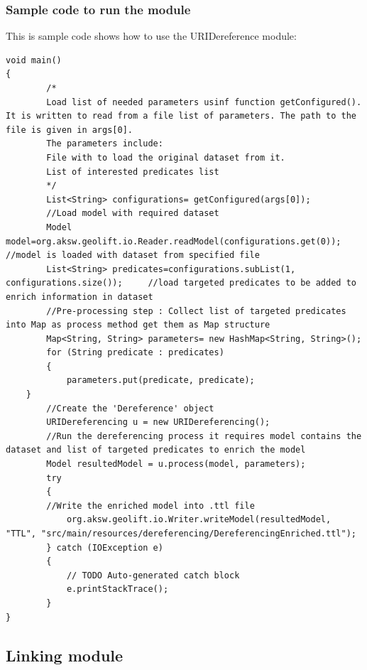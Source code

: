 \documentclass[a4paper,twoside,bibtotoc,abstracton,12pt,BCOR=15mm]{article}
\begin{document}
\subsubsection{Sample code to run the module}
This is sample code shows how to use the URIDereference module:\\
\begin{lstlisting}
void main()
{
    	/*
    	Load list of needed parameters usinf function getConfigured(). It is written to read from a file list of parameters. The path to the file is given in args[0].
    	The parameters include: 
    	File with to load the original dataset from it.
    	List of interested predicates list
    	*/
    	List<String> configurations= getConfigured(args[0]); 
    	//Load model with required dataset
    	Model model=org.aksw.geolift.io.Reader.readModel(configurations.get(0));       //model is loaded with dataset from specified file
    	List<String> predicates=configurations.subList(1, configurations.size());     //load targeted predicates to be added to enrich information in dataset
    	//Pre-processing step : Collect list of targeted predicates into Map as process method get them as Map structure
    	Map<String, String> parameters= new HashMap<String, String>();
    	for (String predicate : predicates) 
    	{
    		parameters.put(predicate, predicate);
	}
    	//Create the 'Dereference' object 
    	URIDereferencing u = new URIDereferencing();
    	//Run the dereferencing process it requires model contains the dataset and list of targeted predicates to enrich the model
    	Model resultedModel = u.process(model, parameters);
		try 
		{ 
		//Write the enriched model into .ttl file
			org.aksw.geolift.io.Writer.writeModel(resultedModel, "TTL", "src/main/resources/dereferencing/DereferencingEnriched.ttl");
		} catch (IOException e) 
		{
			// TODO Auto-generated catch block
			e.printStackTrace();
		}
}

\end{lstlisting}


\subsection{Linking module}
\end{document}
